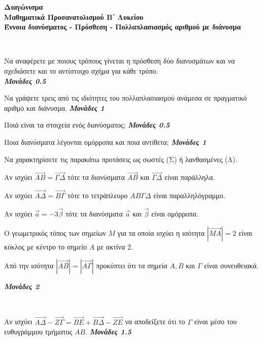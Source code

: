 \documentclass[a4paper,11pt]{article}
\newcommand{\monades}[1]{
\hspace*{\fill}
\textbf{\textit{Μονάδες #1}}}
\newcommand{\swstolathos}{Να χαρακτηρίσετε τις παρακάτω προτάσεις ως σωστές (Σ) ή λανθασμένες (Λ).}
\begin{document}
\begin{center}
{\Large \textbf{Διαγώνισμα}}\\
\textbf{Μαθηματικά Προσανατολισμού Β΄ Λυκείου}\\
\textbf{Έννοια διανύσματος - Πρόσθεση - Πολλαπλασιασμός αριθμού με διάνυσμα}
\end{center}
\begin{thema}
\item\mbox{}\\\vspace{-7mm}
\begin{erwthma}
\item Να αναφέρετε με ποιους τρόπους γίνεται η πρόσθεση δύο διανυσμάτων και να σχεδιάσετε και το αντίστοιχο σχήμα για κάθε τρόπο.\\\monades{0.5}
\item Να γράψετε τρεις από τις ιδιότητες του πολλαπλασιασμού ανάμεσα σε πραγματικό αριθμό και διάνυσμα.\monades{1}
\item Ποιά είναι τα στοιχεία ενός διανύσματος;\monades{0.5}
\item Ποια διανύσματα λέγονται ομόρροπα και ποια αντίθετα;\monades{1}
\item \swstolathos
\begin{alist}
\item Αν ισχύει $ \overrightarrow{AB}=\overrightarrow{\varGamma\varDelta} $ τότε τα διανύσματα $ \overrightarrow{AB} $ και $ \overrightarrow{\varGamma\varDelta} $ είναι παράλληλα.
\item Αν ισχύει $ \overrightarrow{A\varDelta}=\overrightarrow{B\varGamma} $ τότε το τετράπλευρο $ AB\varGamma\varDelta $ είναι παραλληλόγραμμο.
\item Αν ισχύει $ \vec{a}=-3\vec{\beta} $ τότε τα διανύσματα $ \vec{a} $ και $ \vec{\beta} $ είναι ομόρροπα.
\item Ο γεωμετρικός τόπος των σημείων $ M $ για τα οποία ισχύει η ισότητα $ |\overrightarrow{MA}|=2 $ είναι κύκλος με κέντρο το σημείο $ A $ με ακτίνα $ 2 $.
\item Από την ισότητα $ |\overrightarrow{AB}|=|\overrightarrow{A\varGamma}| $ προκύπτει ότι τα σημεία $ A,B $ και $ \varGamma $ είναι συνευθειακά.
\end{alist}\monades{2}
\end{erwthma}
\item\mbox{}\\\vspace{-7mm}
\begin{erwthma}
\item Αν ισχύει $ \overrightarrow{A\varDelta}-\overrightarrow{Z\varGamma}=\overrightarrow{BE}+\overrightarrow{B \varDelta}-\overrightarrow{ZE} $ να αποδείξετε ότι το $ \varGamma $ είναι μέσο του ευθυγράμμου τμήματος $ AB $.\monades{1.5}

\end{erwthma}
\end{thema}
\end{document}

